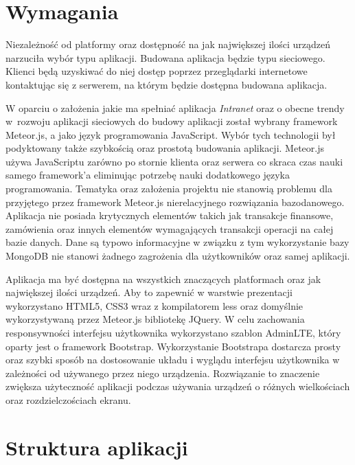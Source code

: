 \section{Wymagania}

Niezależność od platformy oraz dostępność na jak największej ilości urządzeń narzuciła wybór typu aplikacji. Budowana aplikacja będzie typu sieciowego. Klienci będą uzyskiwać do niej dostęp poprzez przeglądarki internetowe kontaktując się z serwerem, na którym będzie dostępna budowana aplikacja. 

W oparciu o założenia jakie ma spełniać aplikacja \emph{Intranet} oraz o obecne trendy w~rozwoju aplikacji sieciowych do budowy aplikacji został wybrany framework Meteor.js, a jako język programowania JavaScript. Wybór tych technologii był podyktowany także szybkością oraz prostotą budowania aplikacji. Meteor.js używa JavaScriptu zarówno po stornie klienta oraz serwera co skraca czas nauki samego framework'a eliminując potrzebę nauki dodatkowego języka programowania. Tematyka oraz założenia projektu nie stanowią problemu dla przyjętego przez framework Meteor.js nierelacyjnego rozwiązania bazodanowego. Aplikacja nie posiada krytycznych elementów takich jak transakcje finansowe, zamówienia oraz innych elementów wymagających transakcji operacji na całej bazie danych. Dane są typowo informacyjne w związku z tym wykorzystanie bazy MongoDB nie stanowi żadnego zagrożenia dla użytkowników oraz samej aplikacji.

Aplikacja ma być dostępna na wszystkich znaczących platformach oraz jak największej ilości urządzeń. Aby to zapewnić w warstwie prezentacji wykorzystano HTML5, CSS3 wraz z kompilatorem less oraz domyślnie wykorzystywaną przez Meteor.js bibliotekę JQuery. W celu zachowania responsywności interfejsu użytkownika wykorzystano szablon AdminLTE, który oparty jest o framework Bootstrap. Wykorzystanie Bootstrapa dostarcza prosty oraz szybki sposób na dostosowanie układu i wyglądu interfejsu użytkownika w zależności od używanego przez niego urządzenia. Rozwiązanie to znaczenie zwiększa użyteczność aplikacji podczas używania urządzeń o różnych wielkościach oraz rozdzielczościach ekranu. 

\section{Struktura aplikacji}

